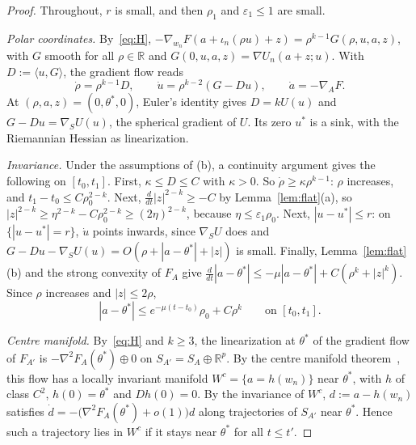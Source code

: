 \documentclass[11pt]{article}
\theoremstyle{definition}
\theoremstyle{remark}
\newcommand{\R}{\mathbb{R}}
\newcommand{\eps}{\varepsilon}
\newcommand{\ip}[2]{\langle #1,#2\rangle}
\begin{document}
\begin{proof}
Throughout, $r$ is small, and then $\rho_1$ and $\eps_1\le1$ are small.

\emph{Polar coordinates.} By~\eqref{eq:H}, $-\nabla_{w_n}F(a+\iota_n(\rho u)+z)=\rho^{k-1}G(\rho,u,a,z)$, with $G$ smooth for all $\rho\in\R$ and $G(0,u,a,z)=\nabla U_n(a+z;u)$. With $D:=\ip{u}{G}$, the gradient flow reads
\begin{equation}\label{eq:polar}
\dot\rho=\rho^{k-1}D,\qquad\dot u=\rho^{k-2}(G-Du),\qquad\dot a=-\nabla_AF.
\end{equation}
At $(\rho,a,z)=(0,\theta^*,0)$, Euler's identity gives $D=kU(u)$ and $G-Du=\nabla_SU(u)$, the spherical gradient of $U$. Its zero $u^*$ is a sink, with the Riemannian Hessian as linearization.

\emph{Invariance.} Under the assumptions of (b), a continuity argument gives the following on $[t_0,t_1]$. First, $\kappa\le D\le C$ with $\kappa>0$. So $\dot\rho\ge\kappa\rho^{k-1}$: $\rho$ increases, and $t_1-t_0\le C\rho_0^{2-k}$. Next, $\frac{d}{dt}|z|^{2-k}\ge-C$ by Lemma~\ref{lem:flat}(a), so $|z|^{2-k}\ge\eta^{2-k}-C\rho_0^{2-k}\ge(2\eta)^{2-k}$, because $\eta\le\eps_1\rho_0$. Next, $|u-u^*|\le r$: on $\{|u-u^*|=r\}$, $\dot u$ points inwards, since $\nabla_SU$ does and $G-Du-\nabla_SU(u)=O(\rho+|a-\theta^*|+|z|)$ is small. Finally, Lemma~\ref{lem:flat}(b) and the strong convexity of $F_A$ give $\frac{d}{dt}|a-\theta^*|\le-\mu|a-\theta^*|+C(\rho^k+|z|^k)$. Since $\rho$ increases and $|z|\le2\rho$,
\begin{equation}\label{eq:slaving}
|a-\theta^*|\le e^{-\mu(t-t_0)}\rho_0+C\rho^k\qquad\text{on }[t_0,t_1].
\end{equation}

\emph{Centre manifold.} By~\eqref{eq:H} and $k\ge3$, the linearization at $\theta^*$ of the gradient flow of $F_{A'}$ is $-\nabla^2F_A(\theta^*)\oplus0$ on $S_{A'}=S_A\oplus\R^p$. By the centre manifold theorem~\cite[Chapter~2, Theorem~1]{Car81}, this flow has a locally invariant manifold $W^c=\{a=h(w_n)\}$ near $\theta^*$, with $h$ of class $C^2$, $h(0)=\theta^*$ and $Dh(0)=0$. By the invariance of $W^c$, $d:=a-h(w_n)$ satisfies $\dot d=-\big(\nabla^2F_A(\theta^*)+o(1)\big)d$ along trajectories of $S_{A'}$ near $\theta^*$. Hence such a trajectory lies in $W^c$ if it stays near $\theta^*$ for all $t\le t'$.


\end{proof}
\end{document}
